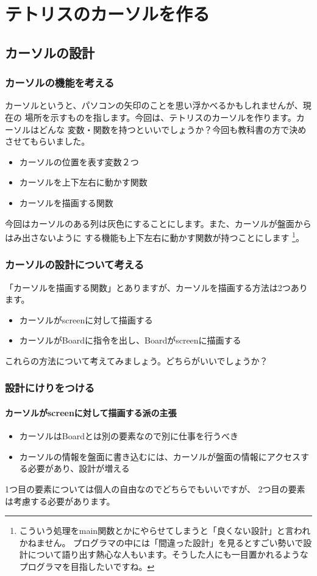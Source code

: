 \chapter{テトリスのカーソルを作る}
\section{カーソルの設計}
\subsection{カーソルの機能を考える}
カーソルというと、パソコンの矢印のことを思い浮かべるかもしれませんが、現在の
場所を示すものを指します。今回は、テトリスのカーソルを作ります。カーソルはどんな
変数・関数を持つといいでしょうか？今回も教科書の方で決めさせてもらいました。
\begin{itemize}
  \item カーソルの位置を表す変数２つ
  \item カーソルを上下左右に動かす関数
  \item カーソルを描画する関数
\end{itemize}
今回はカーソルのある列は灰色にすることにします。また、カーソルが盤面からはみ出さないように
する機能も上下左右に動かす関数が持つことにします
\footnote{こういう処理をmain関数とかにやらせてしまうと「良くない設計」と言われかねません。
  プログラマの中には「間違った設計」を見るとすごい勢いで設計について語り出す熱心な人もいます。そうした人にも一目置かれるようなプログラマを目指したいですね。}。
\subsection{カーソルの設計について考える}
「カーソルを描画する関数」とありますが、カーソルを描画する方法は2つあります。
\begin{itemize}
  \item カーソルがscreenに対して描画する
  \item カーソルがBoardに指令を出し、Boardがscreenに描画する
\end{itemize}
これらの方法について考えてみましょう。どちらがいいでしょうか？
\newpage
\subsection{設計にけりをつける}
\subsubsection{カーソルがscreenに対して描画する派の主張}
\begin{itemize}
  \item カーソルはBoardとは別の要素なので別に仕事を行うべき
  \item カーソルの情報を盤面に書き込むには、カーソルが盤面の情報にアクセスする必要があり、設計が増える
\end{itemize}
1つ目の要素については個人の自由なのでどちらでもいいですが、
2つ目の要素は考慮する必要があります。

